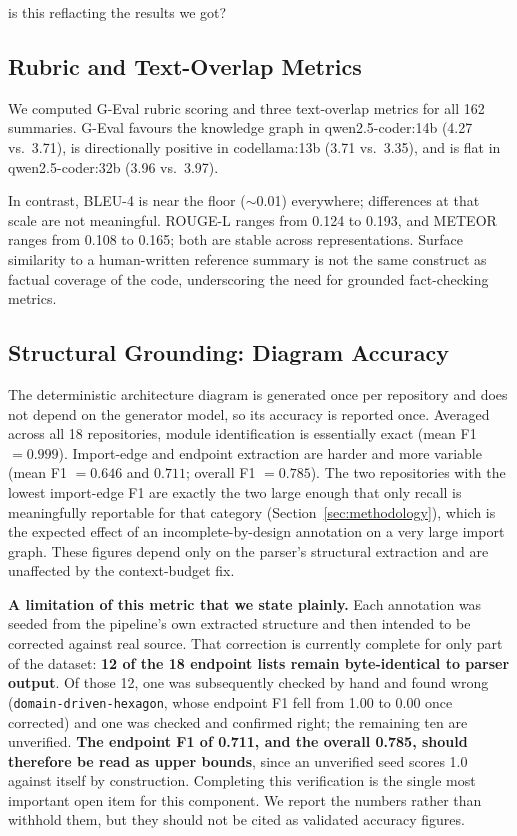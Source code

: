 is this reflacting the results we got?\documentclass[conference]{IEEEtran}
\begin{document}
\subsection{Rubric and Text-Overlap Metrics}
\label{sec:results-scope}
We computed G-Eval rubric scoring and three text-overlap metrics for all 162 summaries. G-Eval favours the knowledge graph in qwen2.5-coder:14b (4.27 vs.\ 3.71), is directionally positive in codellama:13b (3.71 vs.\ 3.35), and is flat in qwen2.5-coder:32b (3.96 vs.\ 3.97).

In contrast, BLEU-4 is near the floor ($\sim$0.01) everywhere; differences at that scale are not meaningful. ROUGE-L ranges from 0.124 to 0.193, and METEOR ranges from 0.108 to 0.165; both are stable across representations. Surface similarity to a human-written reference summary is not the same construct as factual coverage of the code, underscoring the need for grounded fact-checking metrics.

\subsection{Structural Grounding: Diagram Accuracy}
\label{sec:results-diagram}
The deterministic architecture diagram is generated once per repository and does not depend on
the generator model, so its accuracy is reported once. Averaged across all 18 repositories,
module identification is essentially exact (mean F1 $=0.999$). Import-edge and endpoint
extraction are harder and more variable (mean F1 $=0.646$ and $0.711$; overall F1 $=0.785$). The
two repositories with the lowest import-edge F1 are exactly the two large enough that only
recall is meaningfully reportable for that category (Section~\ref{sec:methodology}), which is
the expected effect of an incomplete-by-design annotation on a very large import graph. These
figures depend only on the parser's structural extraction and are unaffected by the
context-budget fix.

\textbf{A limitation of this metric that we state plainly.} Each annotation was seeded from the
pipeline's own extracted structure and then intended to be corrected against real source. That
correction is currently complete for only part of the dataset: \textbf{12 of the 18 endpoint
lists remain byte-identical to parser output}. Of those 12, one was subsequently checked by hand
and found wrong (\texttt{domain-driven-hexagon}, whose endpoint F1 fell from 1.00 to 0.00 once
corrected) and one was checked and confirmed right; the remaining ten are unverified.
\textbf{The endpoint F1 of 0.711, and the overall 0.785, should therefore be read as upper
bounds}, since an unverified seed scores 1.0 against itself by construction. Completing this
verification is the single most important open item for this component. We report the numbers
rather than withhold them, but they should not be cited as validated accuracy figures.
\end{document}
